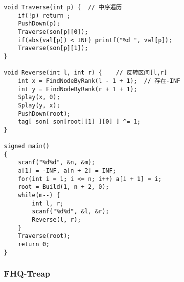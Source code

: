 \begin{lstlisting}
void Traverse(int p) {	// 中序遍历 
	if(!p) return ;
	PushDown(p); 
	Traverse(son[p][0]);
	if(abs(val[p]) < INF) printf("%d ", val[p]);
	Traverse(son[p][1]);
}

void Reverse(int l, int r) {	// 反转区间[l,r] 
	int x = FindNodeByRank(l - 1 + 1);	// 存在-INF 
	int y = FindNodeByRank(r + 1 + 1);
	Splay(x, 0);
	Splay(y, x);
	PushDown(root);
	tag[ son[ son[root][1] ][0] ] ^= 1;
}

signed main()
{
	scanf("%d%d", &n, &m);
	a[1] = -INF, a[n + 2] = INF;
	for(int i = 1; i <= n; i++) a[i + 1] = i;
	root = Build(1, n + 2, 0);
	while(m--) {
		int l, r;
		scanf("%d%d", &l, &r);
		Reverse(l, r);
	}
	Traverse(root);
	return 0;
}
\end{lstlisting}

\subsubsection{FHQ-Treap}
